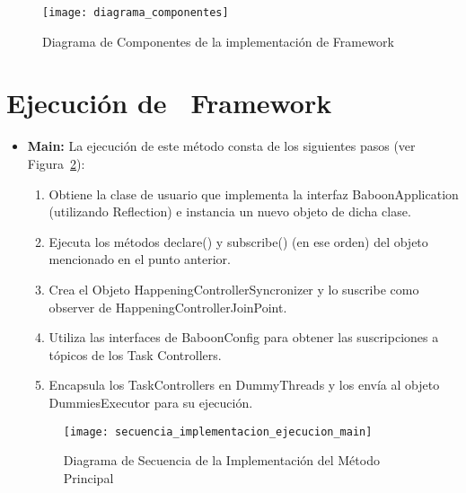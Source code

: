 \begin{figure}[H]
	\vspace*{-4cm}
	\hspace{-1,60cm}
	\texttt{[image: diagrama\_componentes]}
	\caption{Diagrama de Componentes de la implementación de \nombreFramework
	Framework}
	\label{fig:diagrama_componentes}
\end{figure}


\section{Ejecución de \nombreFramework \ Framework}

\begin{itemize}
  \item \textbf{Main: } La ejecución de este método consta de
  los siguientes pasos (ver
  Figura~\ref{fig:diagrama_secuencia_implementacion_ejecucion_main}):
  	\begin{enumerate}
  	  \item Obtiene la clase de usuario que implementa la interfaz
  	  BaboonApplication (utilizando Reflection) e instancia un nuevo objeto de
  	  dicha clase.
  	  \item Ejecuta los métodos declare() y subscribe() (en ese orden) del
  	  objeto mencionado en el punto anterior.
  	  \item Crea el Objeto HappeningControllerSyncronizer y lo suscribe
  	  como observer de HappeningControllerJoinPoint.
  	  \item Utiliza las interfaces de BaboonConfig para obtener las
  	  suscripciones a tópicos de los Task Controllers.
  	  \item Encapsula los TaskControllers en DummyThreads y los envía al objeto
  	  DummiesExecutor para su ejecución.
  	\end{enumerate}
  	
 \begin{figure}[H]
	\hspace{-2,90cm}
	\texttt{[image: secuencia\_implementacion\_ejecucion\_main]}
	\caption{Diagrama de Secuencia de la Implementación del Método Principal}
	\label{fig:diagrama_secuencia_implementacion_ejecucion_main}
\end{figure}



\end{itemize}
